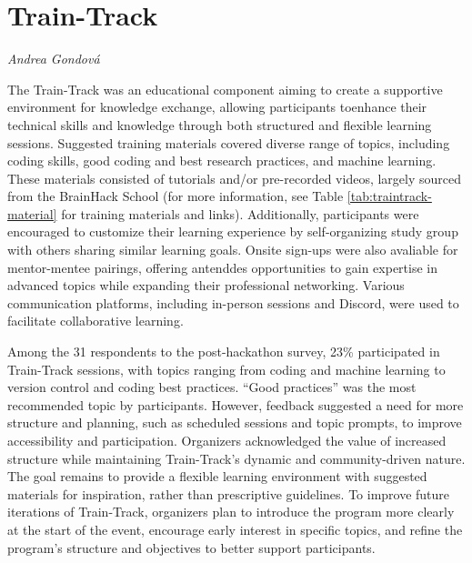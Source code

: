 \documentclass{article}
\newcommand\coordinator[1]{\begin{flushleft}\small\textit{#1}\end{flushleft}}
\begin{document}
\section{Train-Track}
\coordinator{Andrea Gondová}

The Train-Track was an educational component aiming to create a supportive environment for knowledge exchange, allowing participants toenhance their technical skills and knowledge through both structured and flexible learning sessions. Suggested training materials covered diverse range of topics, including coding skills, good coding and best research practices, and machine learning. These materials consisted of tutorials and/or pre-recorded videos, largely sourced from the BrainHack School (for more information, see Table \ref{tab:traintrack-material} for training materials and links). Additionally, participants were encouraged to customize their learning experience  by self-organizing  study group with others sharing similar learning goals. Onsite sign-ups were also avaliable for mentor-mentee pairings, offering antenddes opportunities to gain expertise in advanced topics while expanding their professional networking. Various communication platforms, including in-person sessions and Discord, were used to facilitate collaborative learning.

Among the 31 respondents to the post-hackathon survey, 23\% participated in Train-Track sessions, with topics ranging from coding and machine learning to version control and coding best practices. “Good practices” was the most recommended topic by participants. However, feedback suggested a need for more structure and planning, such as scheduled sessions and topic prompts, to improve accessibility and participation. Organizers acknowledged the value of increased structure while maintaining Train-Track’s dynamic and community-driven nature. The goal remains to provide a flexible learning environment with suggested materials for inspiration, rather than prescriptive guidelines. To improve future iterations of Train-Track, organizers plan to introduce the program more clearly at the start of the event, encourage early interest in specific topics, and refine the program’s structure and objectives to better support participants.
\end{document}

